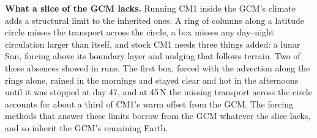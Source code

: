 \textbf{What a slice of the GCM lacks.} Running CM1 inside the GCM's climate adds a structural limit to
the inherited ones. A ring of columns along a latitude circle misses the transport across the circle, a
box misses any day--night circulation larger than itself, and stock CM1 needs three things added: a lunar
Sun, forcing above its boundary layer and nudging that follows terrain. Two of these absences showed in
runs. The first box, forced with the advection along the rings alone, rained in the mornings and stayed
clear and hot in the afternoons until it was stopped at day 47, and at 45\textdegree\,N the missing
transport across the circle accounts for about a third of CM1's warm offset from the GCM. The
forcing methods that answer these limits borrow from the GCM whatever the slice lacks, and so inherit the
GCM's remaining Earth.

